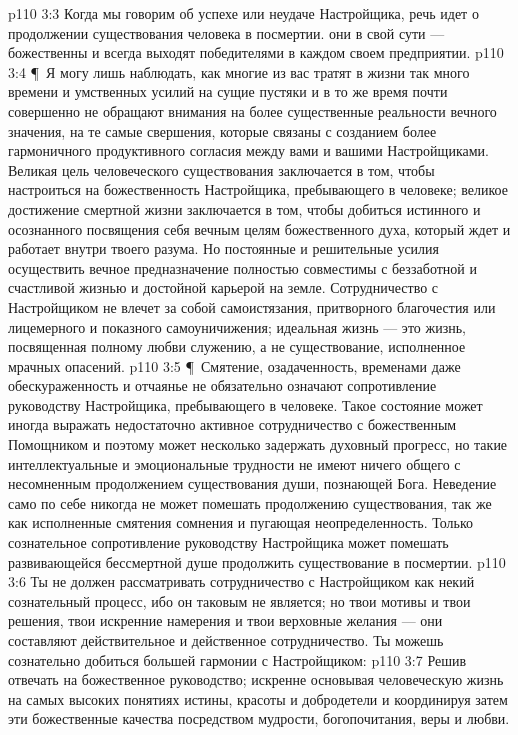 \vs p110 3:3 Когда мы говорим об успехе или неудаче Настройщика, речь идет о продолжении существования человека в посмертии.  они в свой сути --- божественны и всегда выходят победителями в каждом своем предприятии.
\vs p110 3:4 \P\ Я могу лишь наблюдать, как многие из вас тратят в жизни так много времени и умственных усилий на сущие пустяки и в то же время почти совершенно не обращают внимания на более существенные реальности вечного значения, на те самые свершения, которые связаны с созданием более гармоничного продуктивного согласия между вами и вашими Настройщиками. Великая цель человеческого существования заключается в том, чтобы настроиться на божественность Настройщика, пребывающего в человеке; великое достижение смертной жизни заключается в том, чтобы добиться истинного и осознанного посвящения себя вечным целям божественного духа, который ждет и работает внутри твоего разума. Но постоянные и решительные усилия осуществить вечное предназначение полностью совместимы с беззаботной и счастливой жизнью и достойной карьерой на земле. Сотрудничество с Настройщиком не влечет за собой самоистязания, притворного благочестия или лицемерного и показного самоуничижения; идеальная жизнь --- это жизнь, посвященная полному любви служению, а не существование, исполненное мрачных опасений.
\vs p110 3:5 \P\ Смятение, озадаченность, временами даже обескураженность и отчаянье не обязательно означают сопротивление руководству Настройщика, пребывающего в человеке. Такое состояние может иногда выражать недостаточно активное сотрудничество с божественным Помощником и поэтому может несколько задержать духовный прогресс, но такие интеллектуальные и эмоциональные трудности не имеют ничего общего с несомненным продолжением существования души, познающей Бога. Неведение само по себе никогда не может помешать продолжению существования, так же как исполненные смятения сомнения и пугающая неопределенность. Только сознательное сопротивление руководству Настройщика может помешать развивающейся бессмертной душе продолжить существование в посмертии.
\vs p110 3:6 Ты не должен рассматривать сотрудничество с Настройщиком как некий сознательный процесс, ибо он таковым не является; но твои мотивы и твои решения, твои искренние намерения и твои верховные желания --- они составляют действительное и действенное сотрудничество. Ты можешь сознательно добиться большей гармонии с Настройщиком:
\vs p110 3:7 \bibnobreakspace Решив отвечать на божественное руководство; искренне основывая человеческую жизнь на самых высоких понятиях истины, красоты и добродетели и координируя затем эти божественные качества посредством мудрости, богопочитания, веры и любви.
